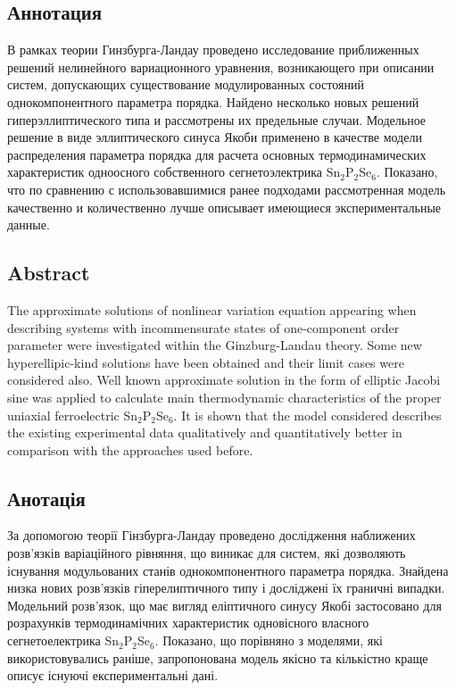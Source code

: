 
\subsection*{Аннотация}
В рамках теории Гинзбурга-Ландау проведено исследование приближенных решений нелинейного вариационного уравнения, возникающего при описании систем, допускающих существование модулированных состояний однокомпонентного параметра порядка.
Найдено несколько новых решений гиперэллиптического типа и рассмотрены их предельные случаи.
Модельное решение в виде эллиптического синуса Якоби применено в качестве модели распределения параметра порядка для расчета основных термодинамических характеристик одноосного собственного сегнетоэлектрика Sn$_2$P$_2$Se$_6$.
Показано, что по сравнению с использовавшимися ранее подходами рассмотренная модель качественно и количественно лучше описывает имеющиеся экспериментальные данные.

\subsection*{Abstract}
The approximate solutions of nonlinear variation equation appearing when describing systems with incommensurate states of one-component order parameter were investigated within the Ginzburg-Landau theory.
Some new hyperellipic-kind solutions have been obtained and their limit cases were considered also.
Well known approximate solution in the form of elliptic Jacobi sine was applied to calculate main thermodynamic characteristics of the proper uniaxial ferroelectric Sn$_2$P$_2$Se$_6$.
It is shown that the model considered describes the existing experimental data qualitatively and quantitatively better in comparison with the approaches used before. 
\subsection*{Анотація}
За допомогою теорії Гінзбурга-Ландау проведено дослідження наближених розв’язків варіаційного рівняння, що виникає для систем, які дозволяють існування модульованих станів однокомпонентного параметра порядка.
Знайдена низка нових розв’язків гіперелиптичного типу і досліджені їх граничні випадки.
Модельний розв’язок, що має вигляд еліптичного синусу Якобі застосовано для розрахунків термодинамічних характеристик одновісного власного сегнетоелектрика Sn$_2$P$_2$Se$_6$.
Показано, що порівняно з моделями, які використовувались раніше, запропонована модель якісно та кількістно краще описує існуючі експериментальні дані.
